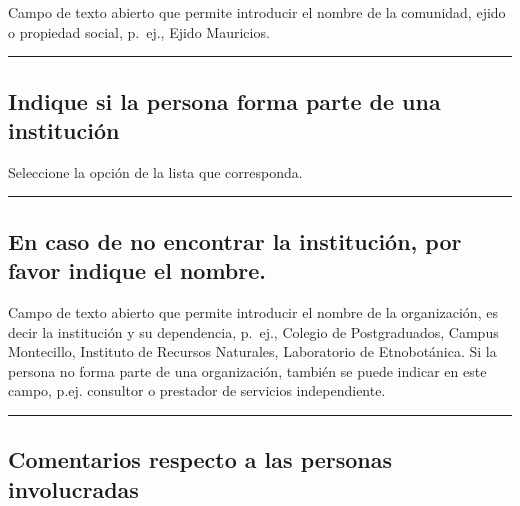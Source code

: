 \documentclass[
]{book}
\begin{document}
Campo de texto abierto que permite introducir el nombre de la comunidad, ejido o propiedad social, p.~ej., Ejido Mauricios.

\begin{center}\rule{0.5\linewidth}{0.5pt}\end{center}

\hypertarget{indique-si-la-persona-forma-parte-de-una-instituciuxf3n}{%
\subsection*{Indique si la persona forma parte de una institución}\label{indique-si-la-persona-forma-parte-de-una-instituciuxf3n}}

Seleccione la opción de la lista que corresponda.

\begin{center}\rule{0.5\linewidth}{0.5pt}\end{center}

\hypertarget{en-caso-de-no-encontrar-la-instituciuxf3n-por-favor-indique-el-nombre.}{%
\subsection*{En caso de no encontrar la institución, por favor indique el nombre.}\label{en-caso-de-no-encontrar-la-instituciuxf3n-por-favor-indique-el-nombre.}}

Campo de texto abierto que permite introducir el nombre de la organización, es decir la institución y su dependencia, p.~ej., Colegio de Postgraduados, Campus Montecillo, Instituto de Recursos Naturales, Laboratorio de Etnobotánica. Si la persona no forma parte de una organización, también se puede indicar en este campo, p.ej. consultor o prestador de servicios independiente.

\begin{center}\rule{0.5\linewidth}{0.5pt}\end{center}

\hypertarget{comentarios-respecto-a-las-personas-involucradas}{%
\subsection*{Comentarios respecto a las personas involucradas}\label{comentarios-respecto-a-las-personas-involucradas}}
\end{document}
